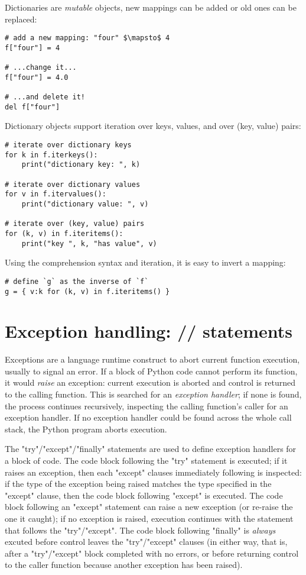 {Dictionaries are \emph{mutable} objects, new mappings can be added or
old ones can be replaced:
\begin{lstlisting}
# add a new mapping: "four" $\mapsto$ 4
f["four"] = 4

# ...change it... 
f["four"] = 4.0

# ...and delete it!
del f["four"]
\end{lstlisting}

Dictionary objects support iteration over keys, values, and over (key,
value) pairs:
\begin{lstlisting}
# iterate over dictionary keys
for k in f.iterkeys(): 
    print("dictionary key: ", k)

# iterate over dictionary values
for v in f.itervalues(): 
    print("dictionary value: ", v)

# iterate over (key, value) pairs
for (k, v) in f.iteritems(): 
    print("key ", k, "has value", v)
\end{lstlisting}
Using the comprehension syntax and iteration, it is easy to invert a
mapping:
\begin{lstlisting}
# define `g` as the inverse of `f`
g = { v:k for (k, v) in f.iteritems() }
\end{lstlisting}


\section[Exception handling]{Exception handling: // statements}
\label{sec:try-except-finally}

Exceptions are a language runtime construct to abort current function
execution, usually to signal an error.  If a block of Python code
cannot perform its function, it would \emph{raise} an exception:
current execution is aborted and control is returned to the calling
function.  This is searched for an \emph{exception handler}; if none
is found, the process continues recursively, inspecting the calling
function's caller for an exception handler.  If no exception handler
could be found across the whole call stack, the Python program aborts
execution.

The "try"/"except"/"finally" statements
are used to define exception handlers for a block of code.  The code
block following the "try" statement is executed; if it
raises an exception, then each "except" clauses immediately
following is inspected: if the type of the exception being raised
matches the type specified in the "except" clause, then the
code block following "except" is executed. The code block
following an "except" statement can raise a new exception
(or re-raise the one it caught); if no exception is raised, execution
continues with the statement that follows the
"try"/"except".  The code block following
"finally" is \emph{always} excuted before control leaves the
"try"/"except" clauses (in either way, that is,
after a "try"/"except" block completed with no
errors, or before returning control to the caller function because
another exception has been raised).

}
